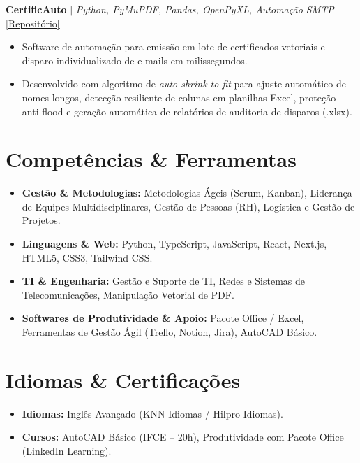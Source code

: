 \documentclass[a4paper,10pt]{article}
\begin{document}
\noindent\textbf{CertificAuto} $\vert$ \textit{Python, PyMuPDF, Pandas, OpenPyXL, Automação SMTP} \hfill \href{https://github.com/Loogan23/CertificAuto}{[Repositório]}
\begin{itemize}
  \item Software de automação para emissão em lote de certificados vetoriais e disparo individualizado de e-mails em milissegundos.
  \item Desenvolvido com algoritmo de \textit{auto shrink-to-fit} para ajuste automático de nomes longos, detecção resiliente de colunas em planilhas Excel, proteção anti-flood e geração automática de relatórios de auditoria de disparos (.xlsx).
\end{itemize}

\section{Competências \& Ferramentas}
\begin{itemize}
  \item \textbf{Gestão \& Metodologias:} Metodologias Ágeis (Scrum, Kanban), Liderança de Equipes Multidisciplinares, Gestão de Pessoas (RH), Logística e Gestão de Projetos.
  \item \textbf{Linguagens \& Web:} Python, TypeScript, JavaScript, React, Next.js, HTML5, CSS3, Tailwind CSS.
  \item \textbf{TI \& Engenharia:} Gestão e Suporte de TI, Redes e Sistemas de Telecomunicações, Manipulação Vetorial de PDF.
  \item \textbf{Softwares de Produtividade \& Apoio:} Pacote Office / Excel, Ferramentas de Gestão Ágil (Trello, Notion, Jira), AutoCAD Básico.
\end{itemize}

\section{Idiomas \& Certificações}
\begin{itemize}
  \item \textbf{Idiomas:} Inglês Avançado (KNN Idiomas / Hilpro Idiomas).
  \item \textbf{Cursos:} AutoCAD Básico (IFCE -- 20h), Produtividade com Pacote Office (LinkedIn Learning).
\end{itemize}
\end{document}
